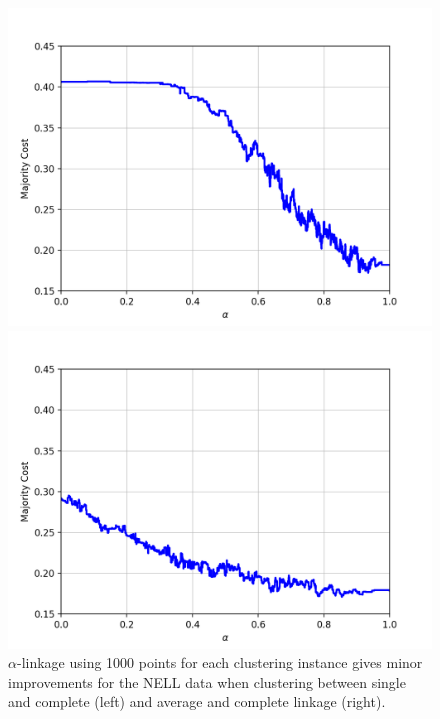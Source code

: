 \begin{figure}[h]
\centering
\begin{minipage}{.45\textwidth}
  \centering
  \includegraphics[width=\linewidth]{plots/nell_sc_1000}
\end{minipage}
\begin{minipage}{.45\textwidth}
  \centering
  \includegraphics[width=\linewidth]{plots/nell_ac_1000}
\end{minipage}
\caption{$\alpha$-linkage using 1000 points for each clustering instance gives minor improvements for the NELL data when clustering between single and complete (left) and average and complete linkage (right).}
\label{fig:nellresults1000}
\end{figure}

